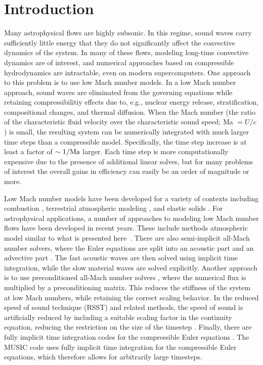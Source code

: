 \section{Introduction} \label{sec:intro}
Many astrophysical flows are highly subsonic.  In this regime,
sound waves carry sufficiently little energy that they do not
significantly affect the convective dynamics of the system.  In many
of these flows, modeling long-time convective dynamics are of
interest, and numerical approaches based on compressible hydrodynamics
are intractable, even on modern supercomputers.  One approach to this
problem is to use low Mach number models.  In a low Mach number
approach, sound waves are eliminated from the governing equations
while retaining compressibilitiy effects due to, e.g., nuclear energy
release, stratification, compositional changes, and thermal diffusion.  When the Mach
number (the ratio of the characteristic fluid velocity over the
characteristic sound speed; Ma $= U/c$) is small, the resulting system
can be numerically integrated with much larger time steps than a
compressible model.  Specifically, the time step increase is at least
a factor of $\sim 1/{\rm Ma}$ larger.  Each time step is more
computationally expensive due to the presence of additional linear
solves, but for many problems of interest the overall gains in
efficiency can easily be an order of magnitude or more.

Low Mach number models have been developed for a variety of contexts
including combustion \citep{day2000numerical}, terrestrial atmospheric
modeling \citep{durran:1989,oneill:2014,duarte2015low}, and elastic
solids \citep{abbate2017all}.  For astrophysical applications, a
number of approaches to modeling low Mach number flows have been
developed in recent years.  These include methods atmospheric model similar to
what is presented here~\cite{Lin:2006}.  There are also  semi-implicit all-Mach
number solvers, where the Euler equations are split into an acoustic
part and an advective part
\citep{Kwatra2009,Degond2009,Cordier2012,Haack2012,Happenhofer2013,Chalons2016,Padioleau2019}.
The fast acoustic waves are then solved using implicit time
integration, while the slow material waves are solved explicitly.
Another approach is to use preconditioned all-Mach number solvers
\citep{Miczek2014,Barsukow2016}, where the numerical flux is
multiplied by a preconditioning matrix.  This reduces the stiffness of
the system at low Mach numbers, while retaining the correct scaling
behavior. In the reduced speed of sound technique (RSST) and related
methods, the speed of sound is artificially reduced by including a
suitable scaling factor in the continuity equation, reducing the
restriction on the size of the timestep
\citep{Rempel2005,Hotta2012,Wang2015,Takeyama2017,Iijima2018}.
Finally, there are fully implicit time integration codes for the
compressible Euler equations
\citep{Viallet2011,kifonidis:2012,Viallet2015,Goffrey2016}.  The MUSIC code
uses fully implicit time integration for the compressible Euler
equations, which therefore allows for arbitrarily large timesteps.


